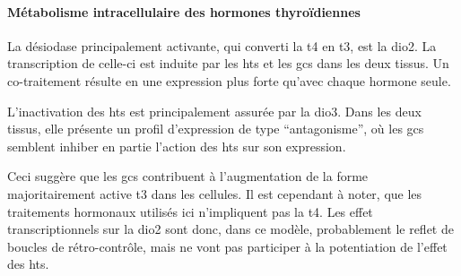 \documentclass[../main.tex]{subfiles}
\begin{document}
			\paragraph{Métabolisme intracellulaire des hormones thyroïdiennes}
				La désiodase principalement activante, qui converti la \gls{t4} en \gls{t3}, est la \gls{dio2}.
				La transcription de celle-ci est induite par les \glspl{ht} et les \glspl{gc} dans les deux tissus.
				Un co-traitement résulte en une expression plus forte qu'avec chaque hormone seule.
				\par
				L'inactivation des \glspl{ht} est principalement assurée par la \gls{dio3}.
				Dans les deux tissus, elle présente un profil d'expression de type ``antagonisme'', où les \glspl{gc} semblent inhiber en partie l'action des \glspl{ht} sur son expression.
				\par
				Ceci suggère que les \glspl{gc} contribuent à l'augmentation de la forme majoritairement active \gls{t3} dans les cellules.
				Il est cependant à noter, que les traitements hormonaux utilisés ici n'impliquent pas la \gls{t4}.
				Les effet transcriptionnels sur la \gls{dio2} sont donc, dans ce modèle, probablement le reflet de boucles de rétro-contrôle, mais ne vont pas participer à la potentiation de l'effet des \glspl{ht}.
\end{document}
